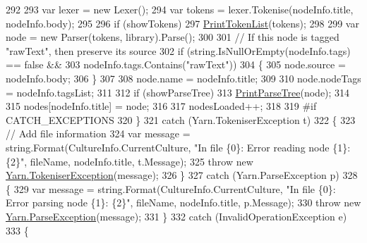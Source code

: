 \begin{DoxyCode}
292 
293                         var lexer = \textcolor{keyword}{new} Lexer();
294                         var tokens = lexer.Tokenise(nodeInfo.title, nodeInfo.body);
295 
296                         \textcolor{keywordflow}{if} (showTokens)
297                             \hyperlink{a00133_a9321fce224021841ce6f70ca7fbe531b}{PrintTokenList}(tokens);
298 
299                         var node = \textcolor{keyword}{new} Parser(tokens, library).Parse();
300 
301                         \textcolor{comment}{// If this node is tagged "rawText", then preserve its source}
302                         \textcolor{keywordflow}{if} (\textcolor{keywordtype}{string}.IsNullOrEmpty(nodeInfo.tags) == \textcolor{keyword}{false} &&
303                             nodeInfo.tags.Contains(\textcolor{stringliteral}{"rawText"}))
304                         \{
305                             node.source = nodeInfo.body;
306                         \}
307 
308                         node.name = nodeInfo.title;
309 
310                         node.nodeTags = nodeInfo.tagsList;
311 
312                         \textcolor{keywordflow}{if} (showParseTree)
313                             \hyperlink{a00133_aa105ea8e5d65a420d1089616523feecc}{PrintParseTree}(node);
314 
315                         nodes[nodeInfo.title] = node;
316 
317                         nodesLoaded++;
318 
319 \textcolor{preprocessor}{#if CATCH\_EXCEPTIONS}
320 \textcolor{preprocessor}{}                    \}
321                     \textcolor{keywordflow}{catch} (Yarn.TokeniserException t)
322                     \{
323                         \textcolor{comment}{// Add file information}
324                         var message = string.Format(CultureInfo.CurrentCulture, \textcolor{stringliteral}{"In file \{0\}: Error reading
       node \{1\}: \{2\}"}, fileName, nodeInfo.title, t.Message);
325                         \textcolor{keywordflow}{throw} \textcolor{keyword}{new} \hyperlink{a00174}{Yarn.TokeniserException}(message);
326                     \}
327                     \textcolor{keywordflow}{catch} (Yarn.ParseException p)
328                     \{
329                         var message = string.Format(CultureInfo.CurrentCulture, \textcolor{stringliteral}{"In file \{0\}: Error parsing
       node \{1\}: \{2\}"}, fileName, nodeInfo.title, p.Message);
330                         \textcolor{keywordflow}{throw} \textcolor{keyword}{new} \hyperlink{a00147}{Yarn.ParseException}(message);
331                     \}
332                     \textcolor{keywordflow}{catch} (InvalidOperationException e)
333                     \{

\end{DoxyCode}
